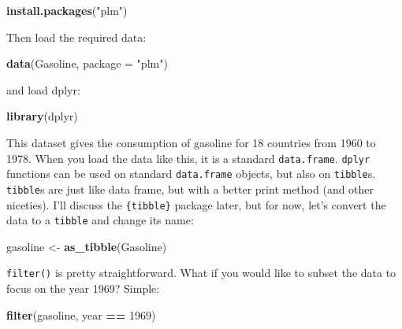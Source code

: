 \documentclass[]{gitbook}
\newenvironment{Shaded}{\begin{snugshade}}{\end{snugshade}}
\newcommand{\DataTypeTok}[1]{\textcolor[rgb]{0.13,0.29,0.53}{#1}}
\newcommand{\DecValTok}[1]{\textcolor[rgb]{0.00,0.00,0.81}{#1}}
\newcommand{\KeywordTok}[1]{\textcolor[rgb]{0.13,0.29,0.53}{\textbf{#1}}}
\newcommand{\NormalTok}[1]{#1}
\newcommand{\OperatorTok}[1]{\textcolor[rgb]{0.81,0.36,0.00}{\textbf{#1}}}
\newcommand{\StringTok}[1]{\textcolor[rgb]{0.31,0.60,0.02}{#1}}
\theoremstyle{definition}
\theoremstyle{definition}
\theoremstyle{definition}
\theoremstyle{remark}
\begin{document}
\begin{Shaded}
\begin{Highlighting}[]
\KeywordTok{install.packages}\NormalTok{(}\StringTok{"plm"}\NormalTok{)}
\end{Highlighting}
\end{Shaded}

Then load the required data:

\begin{Shaded}
\begin{Highlighting}[]
\KeywordTok{data}\NormalTok{(Gasoline, }\DataTypeTok{package =} \StringTok{"plm"}\NormalTok{)}
\end{Highlighting}
\end{Shaded}

and load dplyr:

\begin{Shaded}
\begin{Highlighting}[]
\KeywordTok{library}\NormalTok{(dplyr)}
\end{Highlighting}
\end{Shaded}

This dataset gives the consumption of gasoline for 18 countries from
1960 to 1978. When you load the data like this, it is a standard
\texttt{data.frame}. \texttt{dplyr} functions can be used on standard
\texttt{data.frame} objects, but also on \texttt{tibble}s.
\texttt{tibble}s are just like data frame, but with a better print
method (and other niceties). I'll discuss the \texttt{\{tibble\}}
package later, but for now, let's convert the data to a \texttt{tibble}
and change its name:

\begin{Shaded}
\begin{Highlighting}[]
\NormalTok{gasoline <-}\StringTok{ }\KeywordTok{as_tibble}\NormalTok{(Gasoline)}
\end{Highlighting}
\end{Shaded}

\texttt{filter()} is pretty straightforward. What if you would like to
subset the data to focus on the year 1969? Simple:

\begin{Shaded}
\begin{Highlighting}[]
\KeywordTok{filter}\NormalTok{(gasoline, year }\OperatorTok{==}\StringTok{ }\DecValTok{1969}\NormalTok{)}
\end{Highlighting}
\end{Shaded}
\end{document}

